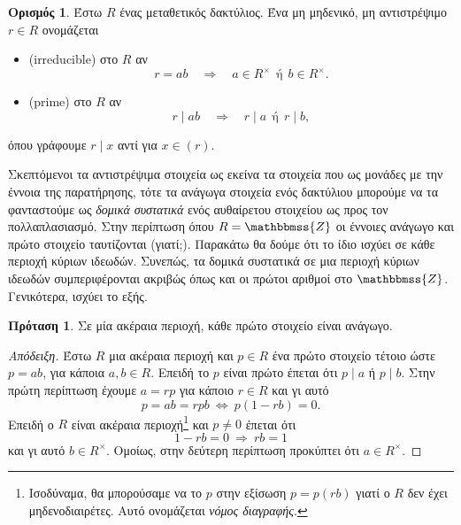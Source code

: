 \documentclass[12pt,a4paper,reqno]{amsart}
\theoremstyle{definition}
\newtheorem{proposition}[theorem]{Πρόταση}
\newtheorem{definition}[theorem]{Ορισμός}
\theoremstyle{remark}
\numberwithin{theorem}{section}
\numberwithin{exercise}{section}
\numberwithin{equation}{section}
\newcommand{\ZZ}{\mathbbmss{Z}}
\newcommand{\then}{\Rightarrow}
\newcommand{\defn}[1]{{\color{mylightblue}{#1}}}
\begin{document}
\begin{definition}
    \label{def:irreducible_prime}
    Έστω $R$ ένας μεταθετικός δακτύλιος. Ένα μη μηδενικό, μη αντιστρέψιμο $r \in R$ ονομάζεται 
    \begin{itemize}
        \item \defn{ανάγωγο} (irreducible) στο $R$ αν 
        \[
        r = ab \quad \then \quad a \in R^\times \ \ \text{ή} \ \ b \in R^\times.
        \]
        \item \defn{πρώτο} (prime) στο $R$ αν 
        \[
        r \mid ab \quad \then \quad r \mid a \ \ \text{ή} \ \ r \mid b,
        \]
    \end{itemize}
    όπου γράφουμε $r \mid x$ αντί για $x \in (r)$.
\end{definition}

Σκεπτόμενοι τα αντιστρέψιμα στοιχεία ως εκείνα τα στοιχεία που  ως μονάδες με την έννοια της παρατήρησης, τότε τα ανάγωγα στοιχεία ενός δακτύλιου μπο\-ρούμε να τα φανταστούμε ως \emph{δομικά συστατικά} ενός αυθαίρετου στοιχείου ως προς τον πολλαπλασιασμό. Στην περίπτωση όπου $R = \ZZ$ οι έννοιες ανάγωγο και πρώτο στοιχείο ταυτίζονται (γιατί;). Παρακάτω θα δούμε ότι το ίδιο ισχύει σε κάθε περιοχή κύριων ιδεωδών. Συνεπώς, τα δομικά συστατικά σε μια περιοχή κύριων ιδεωδών συμπεριφέρονται ακριβώς όπως και οι πρώτοι αριθμοί στο $\ZZ$. Γενικότερα, ισχύει το εξής.
\begin{proposition}
    \label{prop:prime_implies_irreducible}
    Σε μία ακέραια περιοχή, κάθε πρώτο στοιχείο είναι ανάγωγο.
\end{proposition}
\begin{proof}[Απόδειξη]
    Έστω $R$ μια ακέραια περιοχή και $p \in R$ ένα πρώτο στοιχείο τέτοιο ώστε $p = ab$, για κάποια $a, b \in R$. Επειδή το $p$ είναι πρώτο έπεται ότι $p \mid a$ ή $p \mid b$. Στην πρώτη περίπτωση έχουμε $a = rp$ για κάποιο $r \in R$ και γι αυτό 
    \[
    p = ab = rpb \ \Leftrightarrow \ p(1-rb) = 0.
    \]
    Επειδή ο $R$ είναι ακέραια περιοχή\footnote{Ισοδύναμα, θα μπορούσαμε να  το $p$ στην εξίσωση $p = p(rb)$ γιατί ο $R$ δεν έχει μηδενοδιαιρέτες. Αυτό ονομάζεται \emph{νόμος διαγραφής}.} και $p \neq 0$ έπεται ότι 
    \[
    1 - rb = 0 \ \then \ rb = 1
    \]
    και γι αυτό $b \in R^\times$. Ομοίως, στην δεύτερη περίπτωση προκύπτει ότι $a \in R^\times$.
\end{proof}
\end{document}
